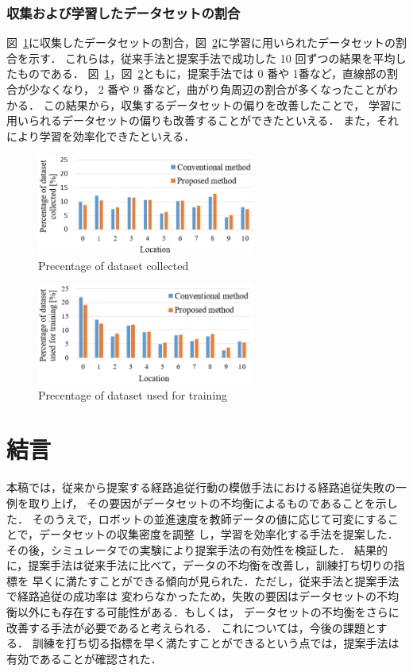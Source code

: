 \documentclass{jarticle}
\renewcommand{\figurename}{図~}
\newcommand{\figref}[1]{\figurename\ref{#1}}
\begin{document}
\subsubsection{収集および学習したデータセットの割合}
\figref{fig:12}に収集したデータセットの割合，\figref{fig:13}に学習に用いられたデータセットの割合を示す．
これらは，従来手法と提案手法で成功した 10 回ずつの結果を平均したものである．
\figref{fig:12}，\figref{fig:13}ともに，提案手法では 0 番や 1番など，直線部の割合が少なくなり，
2 番や 9 番など，曲がり角周辺の割合が多くなったことがわかる．
この結果から，収集するデータセットの偏りを改善したことで，
学習に用いられるデータセットの偏りも改善することができたといえる．
また，それにより学習を効率化できたといえる．

\begin{figure}[h!]
  \centering
   \includegraphics[height=33mm]{./png/dataset_pro2.png}
   \caption{Precentage of dataset collected}
   \label{fig:12}
\end{figure}

\begin{figure}[h!]
  \centering
   \includegraphics[height=33mm]{./png/gaku_pro2.png}
   \caption{Precentage of dataset used for training}
   \label{fig:13}
\end{figure}

\newpage

\section{結言}
本稿では，従来から提案する経路追従行動の模倣手法における経路追従失敗の一例を取り上げ，
その要因がデータセットの不均衡によるものであることを示した．
そのうえで，ロボットの並進速度を教師データの値に応じて可変にすることで，データセットの収集密度を調整
し，学習を効率化する手法を提案した．その後，シミュレータでの実験により提案手法の有効性を検証した．
結果的に，提案手法は従来手法に比べて，データの不均衡を改善し，訓練打ち切りの指標を
早くに満たすことができる傾向が見られた．ただし，従来手法と提案手法で経路追従の成功率は
変わらなかったため，失敗の要因はデータセットの不均衡以外にも存在する可能性がある．もしくは，
データセットの不均衡をさらに改善する手法が必要であると考えられる．
これについては，今後の課題とする．
訓練を打ち切る指標を早く満たすことができるという点では，提案手法は有効であることが確認された．\\
\end{document}
